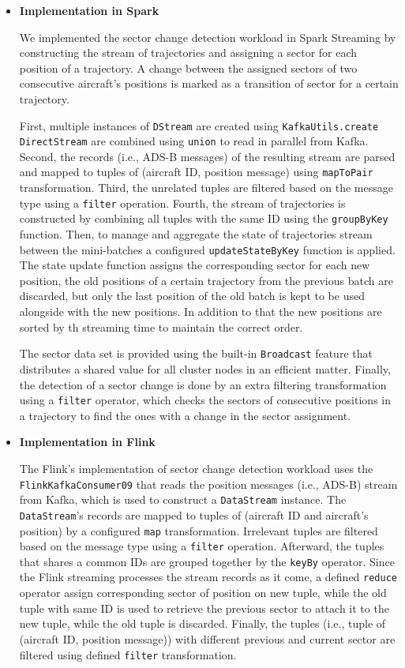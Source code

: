 \documentclass[]{article}
\begin{document}
 \begin{itemize}
 \item {\bf{Implementation in Spark }}
 
 We implemented the sector change detection workload in Spark Streaming by constructing the stream of trajectories and assigning a sector for each position of a trajectory. A change between the assigned sectors of two consecutive aircraft's positions is marked  as a transition of sector for a certain trajectory. \par First, multiple instances of \texttt{DStream} are created using \texttt{KafkaUtils.create} \texttt{DirectStream}  are combined using \texttt{union} to read in  parallel from Kafka. Second, the records (i.e., ADS-B messages) of the resulting stream are parsed and mapped to tuples of (aircraft ID, position message) using \texttt{mapToPair} transformation. Third, the unrelated  tuples are filtered based on the message type using a \texttt{filter} operation. Fourth, the stream of trajectories is constructed by combining all tuples with the same ID using the \texttt{groupByKey} function. Then, to manage and aggregate the state of trajectories stream between the mini-batches a configured \texttt{updateStateByKey} function is applied. The state update function assigns the corresponding sector for each new position, the old positions of a certain trajectory from the previous batch are discarded, but only the last position of the old batch is kept to be used alongside with the new positions. In addition to that the new positions are sorted by th streaming time to maintain the correct order.
 \par The sector data set is provided using the built-in \texttt{Broadcast} feature that distributes a shared value for  all cluster nodes in an efficient matter. Finally, the detection of a sector change is done by an extra filtering transformation using a \texttt{filter} operator, which checks the sectors of consecutive positions in a trajectory to find the ones with a change in the sector assignment.

 
  
 \item {\bf{Implementation in Flink }}
 
 The Flink's implementation of sector change detection workload uses the \texttt{FlinkKafkaConsumer09} that reads the position messages (i.e., ADS-B) stream from Kafka, which is used to construct a \texttt{DataStream} instance. The \texttt{DataStream}'s records are mapped to tuples of (aircraft ID and aircraft's position) by a configured \texttt{map} transformation. Irrelevant tuples are filtered based on the message type using a \texttt{filter} operation. Afterward, the tuples that shares a common IDs are grouped together by the \texttt{keyBy} operator. Since the Flink streaming processes the stream records as it come, a defined \texttt{reduce} operator assign corresponding sector of position on new tuple, while the old tuple with same ID is used to retrieve the previous sector to attach it to the new tuple, while the old tuple is discarded. Finally, the tuples (i.e., tuple of (aircraft ID, position message)) with different previous and current sector are filtered using defined \texttt{filter} transformation.


\end{itemize}
\end{document}
